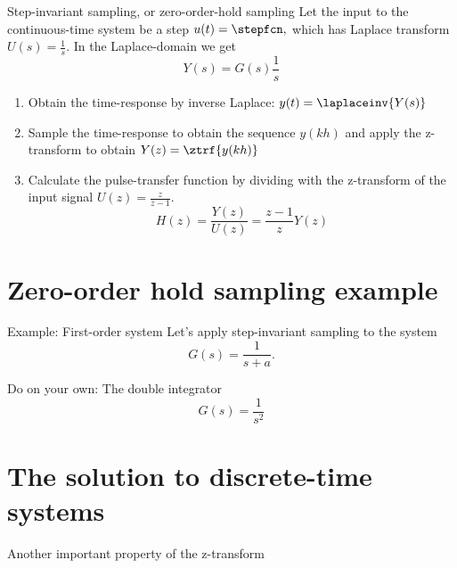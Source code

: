 \documentclass[presentation,aspectratio=169]{beamer}
\begin{document}
\begin{frame}[label={sec:orgeeea6e6}]{Step-invariant sampling, or zero-order-hold sampling}
Let the input to the continuous-time system be a step \(u(t)=\stepfcn,\) which has Laplace transform \(U(s)=\frac{1}{s}.\) In the Laplace-domain we get
\[Y(s) = G(s)\frac{1}{s}\]
\begin{enumerate}
\item Obtain the time-response by inverse Laplace: \(y(t)=\laplaceinv{Y(s)}\)
\item Sample the time-response to obtain the sequence \(y(kh)\) and apply  the z-transform to obtain \(Y(z) = \ztrf{y(kh)}\)
\item Calculate the pulse-transfer function by dividing with the z-transform of the input signal \(U(z) = \frac{z}{z-1}.\) \[H(z) = \frac{Y(z)}{U(z)} = \frac{z-1}{z}Y(z) \]
\end{enumerate}
\end{frame}

\section{Zero-order hold sampling example}
\label{sec:orgb8e6c6a}
\begin{frame}[label={sec:org3040f70}]{Example: First-order system}
Let's apply step-invariant sampling to the system
\[ G(s) = \frac{1}{s + a}. \]
\end{frame}

\begin{frame}[label={sec:orgf92c785}]{Do on your own: The double integrator}
\[ G(s) = \frac{1}{s^2} \]
\end{frame}

\section{The solution to discrete-time systems}
\label{sec:orgc55076c}
\begin{frame}[label={sec:orgc9228fc}]{Another important property of the z-transform}
\end{frame}
\end{document}
